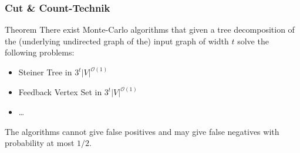\documentclass{beamer}
\begin{document}
\begin{frame}
\frametitle{Cut \& Count-Technik}
\begin{block}{Theorem}
There exist Monte-Carlo algorithms that given a tree decomposition of the (underlying undirected
graph of the) input graph of width $t$ solve the following problems:
\begin{itemize}
\item Steiner Tree in $3^t|V|^{\mathcal{O}(1)}$
\item Feedback Vertex Set in $3^t|V|^{\mathcal{O}(1)}$
\item \dots
\end{itemize}
The algorithms cannot give false positives and may give false negatives with probability at most $1/2$.
\end{block}
\end{frame}

\end{document}
